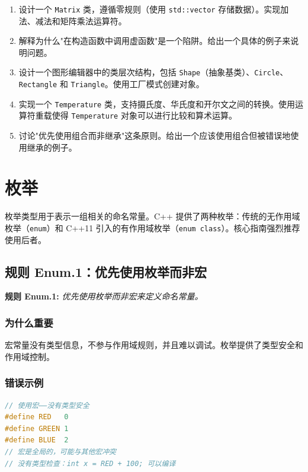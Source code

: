 \begin{enumerate}
  \item 设计一个 \texttt{Matrix} 类，遵循零规则（使用 \texttt{std::vector} 存储数据）。实现加法、减法和矩阵乘法运算符。
  \item 解释为什么"在构造函数中调用虚函数"是一个陷阱。给出一个具体的例子来说明问题。
  \item 设计一个图形编辑器中的类层次结构，包括 \texttt{Shape}（抽象基类）、\texttt{Circle}、\texttt{Rectangle} 和 \texttt{Triangle}。使用工厂模式创建对象。
  \item 实现一个 \texttt{Temperature} 类，支持摄氏度、华氏度和开尔文之间的转换。使用运算符重载使得 \texttt{Temperature} 对象可以进行比较和算术运算。
  \item 讨论"优先使用组合而非继承"这条原则。给出一个应该使用组合但被错误地使用继承的例子。
\end{enumerate}


\chapter{枚举}

枚举类型用于表示一组相关的命名常量。C++ 提供了两种枚举：传统的无作用域枚举（\texttt{enum}）和 C++11 引入的有作用域枚举（\texttt{enum class}）。核心指南强烈推荐使用后者。

\section{规则 Enum.1：优先使用枚举而非宏}

\textbf{规则 Enum.1:} \textit{优先使用枚举而非宏来定义命名常量。}

\subsection{为什么重要}

宏常量没有类型信息，不参与作用域规则，并且难以调试。枚举提供了类型安全和作用域控制。

\subsection{错误示例}

\begin{lstlisting}[language=C++]
// 使用宏——没有类型安全
#define RED   0
#define GREEN 1
#define BLUE  2
// 宏是全局的，可能与其他宏冲突
// 没有类型检查：int x = RED + 100; 可以编译
\end{lstlisting}

